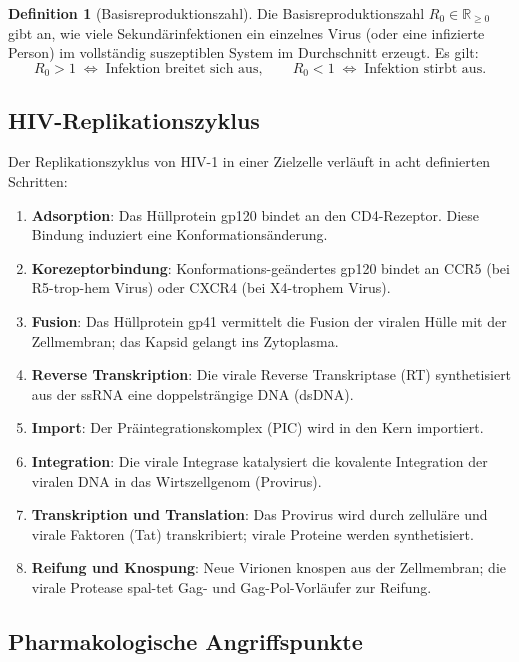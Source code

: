 ﻿\documentclass[a4paper,12pt]{article}
\theoremstyle{definition}
\newtheorem{definition}{Definition}
\begin{document}
\begin{definition}[Basisreproduktionszahl]
Die Basisreproduktionszahl $R_0 \in \mathbb{R}_{\geq 0}$ gibt an, wie viele Sekund\"arinfektionen
ein einzelnes Virus (oder eine infizierte Person) im vollst\"andig suszeptiblen System
im Durchschnitt erzeugt. Es gilt:
\[
R_0 > 1 \;\Leftrightarrow\; \text{Infektion breitet sich aus}, \qquad
R_0 < 1 \;\Leftrightarrow\; \text{Infektion stirbt aus}.
\]
\end{definition}

\subsection{HIV-Replikationszyklus}

Der Replikationszyklus von HIV-1 in einer Zielzelle verl\"auft in acht definierten Schritten:

\begin{enumerate}
\item \textbf{Adsorption}: Das Hüllprotein gp120 bindet an den CD4-Rezeptor.
      Diese Bindung induziert eine Konformations\"anderung.
\item \textbf{Korezeptorbindung}: Konformations-ge\"andertes gp120 bindet an CCR5
      (bei R5-trop-hem Virus) oder CXCR4 (bei X4-trophem Virus).
\item \textbf{Fusion}: Das Hüllprotein gp41 vermittelt die Fusion der viralen Hülle
      mit der Zellmembran; das Kapsid gelangt ins Zytoplasma.
\item \textbf{Reverse Transkription}: Die virale Reverse Transkriptase (RT) synthetisiert
      aus der ssRNA eine doppelsträngige DNA (dsDNA).
\item \textbf{Import}: Der Pr\"aintegrationskomplex (PIC) wird in den Kern importiert.
\item \textbf{Integration}: Die virale Integrase katalysiert die kovalente Integration
      der viralen DNA in das Wirtszellgenom (Provirus).
\item \textbf{Transkription und Translation}: Das Provirus wird durch zelluläre und virale
      Faktoren (Tat) transkribiert; virale Proteine werden synthetisiert.
\item \textbf{Reifung und Knospung}: Neue Virionen knospen aus der Zellmembran;
      die virale Protease spal-tet Gag- und Gag-Pol-Vorläufer zur Reifung.
\end{enumerate}

\subsection{Pharmakologische Angriffspunkte}
\end{document}
